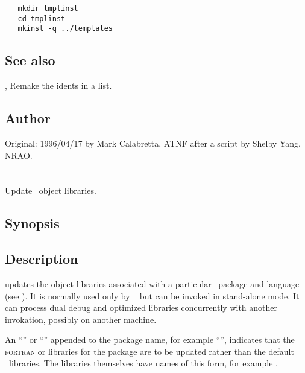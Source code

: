\begin{verbatim}
   mkdir tmplinst
   cd tmplinst
   mkinst -q ../templates
\end{verbatim}
 
\subsection*{See also}
 
, Remake the idents in a  list.
 
\subsection*{Author}
 
Original: 1996/04/17 by Mark Calabretta, ATNF after a  script by
Shelby Yang, NRAO.
 

\newpage
\section{}
\label{updatelib}

Update \aipspp\ object libraries.

\subsection*{Synopsis}

\begin{synopsis}
\end{synopsis}

\subsection*{Description}

 updates the object libraries associated with a particular
\aipspp\ package and language (see ).  It is normally used only
by \aipspp\  but can be invoked in stand-alone mode.  It can
process dual debug and optimized libraries concurrently with another
invokation, possibly on another machine.

An ``'' or ``'' appended to the package name, for example
``'', indicates that the \textsc{fortran} or 
libraries for the package are to be updated rather than the default
\cplusplus\ libraries.  The libraries themselves have names of this form, for
example .

